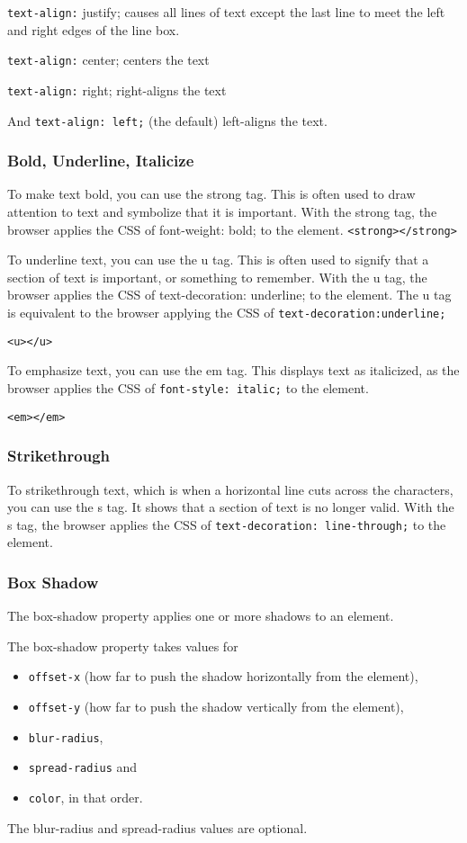 \texttt{text-align:} justify; causes all lines of text except the last line to meet the left and right edges of the line box.

\texttt{text-align:} center; centers the text

\texttt{text-align:} right; right-aligns the text

And \texttt{text-align: left;} (the default) left-aligns the text.

\subsubsection{Bold, Underline, Italicize}
To make text bold, you can use the strong tag. This is often used to draw attention to text and symbolize that it is important. With the strong tag, the browser applies the CSS of font-weight: bold; to the element.
\texttt{<strong></strong>}

To underline text, you can use the u tag. This is often used to signify that a section of text is important, or something to remember. With the u tag, the browser applies the CSS of text-decoration: underline; to the element. The u tag is equivalent to the browser applying the CSS of \texttt{text-decoration:underline;}

\texttt{<u></u>}

To emphasize text, you can use the em tag. This displays text as italicized, as the browser applies the CSS of \texttt{font-style: italic;} to the element.

\texttt{<em></em>}

\subsubsection{Strikethrough}
To strikethrough text, which is when a horizontal line cuts across the characters, you can use the s tag. It shows that a section of text is no longer valid. With the s tag, the browser applies the CSS of \texttt{text-decoration: line-through;} to the element.

\subsubsection{Box Shadow}


The box-shadow property applies one or more shadows to an element.

The box-shadow property takes values for
\begin{itemize}
    \item \texttt{offset-x} (how far to push the shadow horizontally from the element),
    \item \texttt{offset-y} (how far to push the shadow vertically from the element),
    \item \texttt{blur-radius},
    \item \texttt{spread-radius} and
    \item \texttt{color}, in that order.
\end{itemize}
The blur-radius and spread-radius values are optional.

